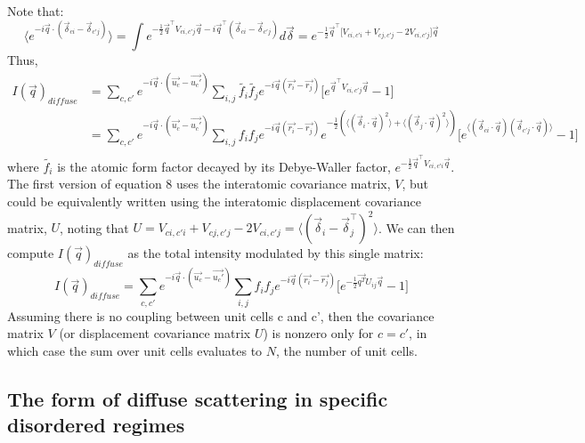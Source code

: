 \documentclass{article}
\begin{document}
Note that:
\begin{equation}
\langle e^{-i {\vec{q}} \cdot (\vec{\delta}_{ci} - \vec{\delta}_{c'j}) } \rangle = \int e^{-\frac{1}{2} \vec{q}^\intercal V_{ci,c'j} \vec{q} - i \vec{q}^\intercal (\vec{\delta}_{ci} - \vec{\delta}_{c'j}) } d \vec{\delta} = e^{ -\frac{1}{2} \vec{q}^\intercal \lbrack V_{ci,c'i} + V_{cj,c'j} - 2V_{ci,c'j} \rbrack \vec{q} }
\end{equation}
Thus,
\begin{equation}
\begin{aligned}
I(\vec{q})_{diffuse} & = \sum\limits_{c,c'} e^{-i \vec{q} \cdot (\vec{u_c} - \vec{u_c'})} \sum\limits_{i,j} \tilde{f_i} \tilde{f_j} e^{-i \vec{q} (\vec{r_i} - \vec{r_j})} \lbrack e^{ \vec{q}^\intercal V_{ci,c'j} \vec{q} } - 1 \rbrack \\
& = \sum\limits_{c,c'} e^{-i \vec{q} \cdot (\vec{u_c} - \vec{u_c'})} \sum\limits_{i,j} f_i f_j e^{-i \vec{q} (\vec{r_i} - \vec{r_j})} e^{-\frac{1}{2} (\langle (\vec{\delta}_i \cdot \vec{q})^2 \rangle + \langle (\vec{\delta}_j \cdot \vec{q})^2 \rangle) } \lbrack e^{\langle ( \vec{\delta}_{ci} \cdot \vec{q} ) ( \vec{\delta}_{c'j} \cdot \vec{q} ) \rangle} - 1 \rbrack \\
\end{aligned}
\end{equation}
where $\tilde{f_i}$ is the atomic form factor decayed by its Debye-Waller factor, $e^{ -\frac{1}{2} \vec{q}^\intercal V_{ci,c'i} \vec{q} }$. The first version of equation 8 uses the interatomic covariance matrix, $V$, but could be equivalently written using the interatomic displacement covariance matrix, $U$, noting that $U = V_{ci,c'i} + V_{cj,c'j} - 2V_{ci,c'j} = \langle (\vec{\delta}_i - \vec{\delta}_j ^\intercal)^2 \rangle $. We can then compute $I(\vec{q})_{diffuse}$ as the total intensity modulated by this single matrix:
\begin{equation}
I(\vec{q})_{diffuse} = \sum\limits_{c,c'} e^{-i \vec{q} \cdot (\vec{u_c} - \vec{u_c'})} \sum\limits_{i,j} f_i f_j e^{-i \vec{q} (\vec{r_i} - \vec{r_j})} \lbrack e^{-\frac{1}{2}\vec{q^T}U_{ij}\vec{q}} - 1 \rbrack
\end{equation}
Assuming there is no coupling between unit cells c and c', then the covariance matrix $V$ (or displacement covariance matrix $U$) is nonzero only for $c=c'$, in which case the sum over unit cells evaluates to $N$, the number of unit cells.

\subsection{The form of diffuse scattering in specific disordered regimes}
\end{document}
